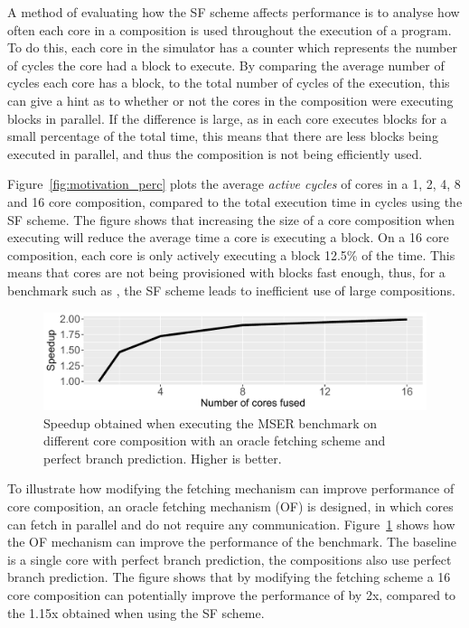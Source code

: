 A method of evaluating how the SF scheme affects performance is to analyse how often each core in a composition is used throughout the execution of a program.
To do this, each core in the simulator has a counter which represents the number of cycles the core had a block to execute.
By comparing the average number of cycles each core has a block, to the total number of cycles of the execution, this can give a hint as to whether or not the cores in the composition were executing blocks in parallel.
If the difference is large, as in each core executes blocks for a small percentage of the total time, this means that there are less blocks being executed in parallel, and thus the composition is not being efficiently used.

Figure~\ref{fig:motivation_perc} plots the average \textit{active cycles} of cores in a 1, 2, 4, 8 and 16 core composition, compared to the total execution time in cycles using the SF scheme.
The figure shows that increasing the size of a core composition when executing  will reduce the average time a core is executing a block.
On a 16 core composition, each core is only actively executing a block 12.5\% of the time.
This means that cores are not being provisioned with blocks fast enough, thus, for a benchmark such as , the SF scheme leads to inefficient use of large compositions.

\begin{figure}[t]
    \centering
    \includegraphics[width=1\textwidth]{chapter3/graphics/perfect_fetch_motiv.pdf}
    \caption{Speedup obtained when executing the MSER benchmark on different core composition with an oracle fetching scheme and perfect branch prediction. Higher is better. }
    \label{fig:motivation_fetch}
	\vspace{1em}
\end{figure}

To illustrate how modifying the fetching mechanism can improve performance of core composition, an oracle fetching mechanism (OF) is designed, in which cores can fetch in parallel and do not require any communication.
Figure~\ref{fig:motivation_fetch} shows how the OF mechanism can improve the performance of the  benchmark.
The baseline is a single core with perfect branch prediction, the compositions also use perfect branch prediction.
The figure shows that by modifying the fetching scheme a 16 core composition can potentially improve the performance of  by 2x, compared to the 1.15x obtained when using the SF scheme.

